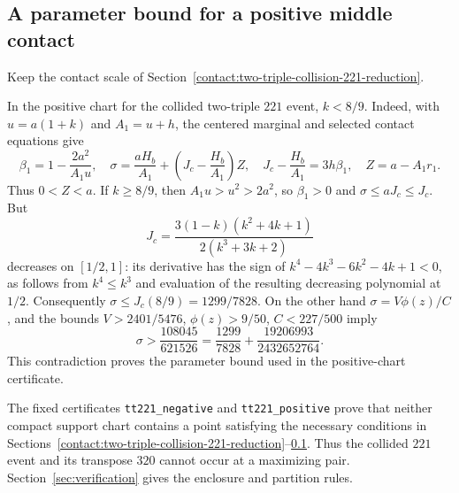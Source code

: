 \subsection{A parameter bound for a positive middle contact}\label{contact:positive-parameter}
Keep the contact scale of Section~\ref{contact:two-triple-collision-221-reduction}.

In the positive chart for the collided two-triple $221$ event, $k<8/9$.
Indeed, with $u=a(1+k)$ and $A_1=u+h$, the centered marginal and selected
contact equations give
\[
 \beta_1=1-\frac{2a^2}{A_1u},\quad
 \sigma=\frac{aH_b}{A_1}+\left(J_c-\frac{H_b}{A_1}\right)Z,\quad
 J_c-\frac{H_b}{A_1}=3h\beta_1,\quad Z=a-A_1r_1.
\]
Thus $0<Z<a$. If $k\ge8/9$, then $A_1u>u^2>2a^2$, so
$\beta_1>0$ and $\sigma\le aJ_c\le J_c$. But
\[
 J_c=\frac{3(1-k)(k^2+4k+1)}{2(k^3+3k+2)}
\]
decreases on $[1/2,1]$: its derivative has the sign of
$k^4-4k^3-6k^2-4k+1<0$, as follows from $k^4\le k^3$ and evaluation
of the resulting decreasing polynomial at $1/2$. Consequently
$\sigma\le J_c(8/9)=1299/7828$.
On the other hand $\sigma=V\phi(z)/C$, and the bounds
$V>2401/5476$, $\phi(z)>9/50$, $C<227/500$ imply
\[
 \sigma>\frac{108045}{621526}
 =\frac{1299}{7828}+\frac{19206993}{2432652764}.
\]
This contradiction proves the parameter bound used in the positive-chart
certificate.

The fixed certificates \texttt{tt221\_negative} and
\texttt{tt221\_positive} prove that neither compact support chart
contains a point satisfying the necessary conditions in
Sections~\ref{contact:two-triple-collision-221-reduction}--\ref{contact:positive-parameter}.
Thus the collided $221$ event and its transpose $320$ cannot occur
at a maximizing pair. Section~\ref{sec:verification} gives the enclosure
and partition rules.

